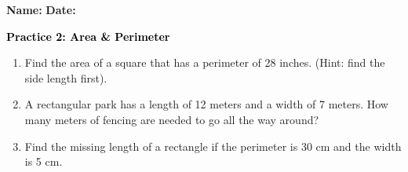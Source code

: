\documentclass[12pt, letterpaper, fleqn]{article}
\begin{document}
\textbf{Name:} \underline{\hspace{5cm}}
\hfill
\textbf{Date:} \underline{\hspace{3cm}}\\

\begin{tcolorbox}[colback=customteal!20]
    \large\textcolor{black}{\textbf{Practice 2: Area \& Perimeter}}
\end{tcolorbox}
\begin{enumerate}[itemsep=3.5cm, leftmargin=0.6cm]
\item Find the area of a square that has a perimeter of 28 inches. (Hint: find the side length first).
\vspace{3.5cm}
\item A rectangular park has a length of 12 meters and a width of 7 meters. How many meters of fencing are needed to go all the way around?
\vspace{3.5cm}
\item Find the missing length of a rectangle if the perimeter is 30 cm and the width is 5 cm.
\end{enumerate}
\end{document}
